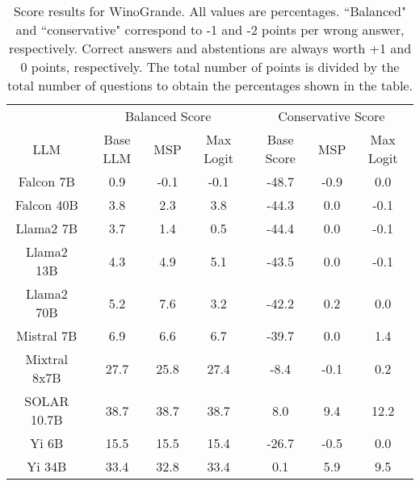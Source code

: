 \renewcommand\arraystretch{1.2}
\begin{table*}
\centering
\begin{tabular}{c|c|c|c|c|c|c}
& \multicolumn{3}{c|}{Balanced Score} & \multicolumn{3}{c}{Conservative Score} \\ 
LLM & Base LLM & MSP & Max Logit & Base Score & MSP & Max Logit\\ \hline
Falcon 7B & 0.9 & -0.1 & -0.1 & -48.7 & -0.9 & 0.0\\
Falcon 40B & 3.8 & 2.3 & 3.8 & -44.3 & 0.0 & -0.1\\
Llama2 7B & 3.7 & 1.4 & 0.5 & -44.4 & 0.0 & -0.1\\
Llama2 13B & 4.3 & 4.9 & 5.1 & -43.5 & 0.0 & -0.1\\
Llama2 70B & 5.2 & 7.6 & 3.2 & -42.2 & 0.2 & 0.0\\
Mistral 7B & 6.9 & 6.6 & 6.7 & -39.7 & 0.0 & 1.4\\
Mixtral 8x7B & 27.7 & 25.8 & 27.4 & -8.4 & -0.1 & 0.2\\
SOLAR 10.7B & 38.7 & 38.7 & 38.7 & 8.0 & 9.4 & 12.2\\
Yi 6B & 15.5 & 15.5 & 15.4 & -26.7 & -0.5 & 0.0\\
Yi 34B & 33.4 & 32.8 & 33.4 & 0.1 & 5.9 & 9.5\\
\hline
\end{tabular}
\caption{Score results for WinoGrande. All values are percentages. ``Balanced" and ``conservative" correspond to -1 and -2 points per wrong answer, respectively. Correct answers and abstentions are always worth +1 and 0 points, respectively. The total number of points is divided by the total number of questions to obtain the percentages shown in the table.}
\label{tab:winogrande_score}
\end{table*}
